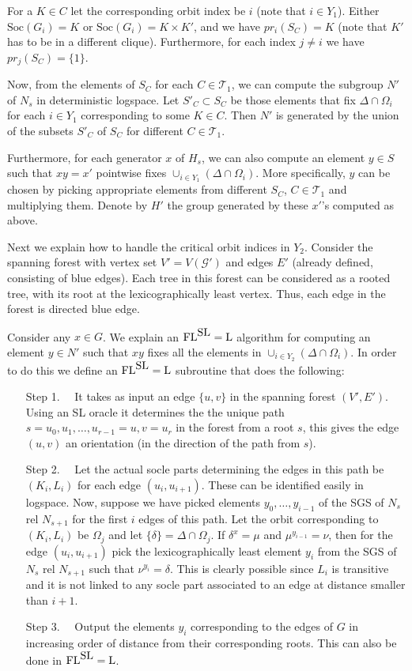 \documentclass[11pt]{article}
\newcommand{\Lo}{\ensuremath{\mathrm{L}}}
\newcommand{\SL}{\mbox{\rm SL}}
\newcommand{\FL}{\mbox{\rm FL}}
\newcommand{\Soc}[1]{\ensuremath{\mathrm{Soc}\left(#1\right)}}
\newcommand{\pr}[2]{\ensuremath{pr_{#1}\left({#2}\right)}}
\begin{document}
\noindent
For a $K\in C$ let the corresponding orbit index be $i$ (note that
$i\in Y_1$). Either $\Soc{G_i}=K$ or $\Soc{G_i}=K\times K'$, and we
have $\pr{i}{S_C}=K$ (note that $K'$ has to be in a different
clique). Furthermore, for each index $j\neq i$ we have
$\pr{j}{S_C}=\{1\}$.

Now, from the elements of $S_C$ for each $C\in\mathcal{T}_1$, we can
compute the subgroup $N'$ of $N_s$ in deterministic logspace. Let
$S'_C\subset S_C$ be those elements that fix $\Delta\cap\Omega_i$ for
each $i\in Y_1$ corresponding to some $K\in C$. Then $N'$ is generated
by the union of the subsets $S'_C$ of $S_C$ for different
$C\in\mathcal{T}_1$.

Furthermore, for each generator $x$ of $H_s$, we can also compute an
element $y\in S$ such that $xy=x'$ pointwise fixes $\cup_{i\in
Y_1}(\Delta\cap\Omega_i)$. More specifically, $y$ can be chosen by
picking appropriate elements from different $S_C$, $C\in\mathcal{T}_1$
and multiplying them. Denote by $H'$ the group generated by these
$x'$'s computed as above.

Next we explain how to handle the critical orbit indices in $Y_2$.
Consider the spanning forest with vertex set $V'=V(\mathcal{G}')$ and
edges $E'$ (already defined, consisting of blue edges). Each tree in
this forest can be considered as a rooted tree, with its root at the
lexicographically least vertex. Thus, each edge in the forest is
directed blue edge.

Consider any $x\in G$. We explain an $\FL^{\SL}=\Lo$ algorithm for
computing an element $y\in N'$ such that $xy$ fixes all the elements
in $\cup_{i\in Y_2}(\Delta\cap\Omega_i)$. In order to do this we define
an $\FL^{\SL}=\Lo$ subroutine that does the following:

\begin{enumerate}
\item[Step 1.]~~It takes as input an edge $\{u,v\}$ in the spanning
forest $(V',E')$. Using an SL oracle it determines the the unique path
$s=u_0,u_1,\ldots,u_{r-1}=u,v=u_r$ in the forest from a root $s$, this
gives the edge $(u,v)$ an orientation (in the direction of the path
from $s$).

\item[Step 2.]~~Let the actual socle parts determining the edges in
this path be $(K_i,L_i)$ for each edge $(u_i,u_{i+1})$. These can be
identified easily in logspace. Now, suppose we have picked elements
$y_0,\ldots,y_{i-1}$ of the SGS of $N_s$ rel $N_{s+1}$ for the first
$i$ edges of this path. Let the orbit corresponding to $(K_i,L_i)$ be
$\Omega_j$ and let $\{\delta\}=\Delta\cap \Omega_j$.  If
$\delta^x=\mu$ and $\mu^{y_{i-1}}=\nu$, then for the edge
$(u_i,u_{i+1})$ pick the lexicographically least element $y_i$ from
the SGS of $N_s$ rel $N_{s+1}$ such that $\nu^{y_i}=\delta$. This is
clearly possible since $L_i$ is transitive and it is not linked to any
socle part associated to an edge at distance smaller than $i+1$.

\item[Step 3.]~~Output the elements $y_i$ corresponding to the edges
of $G$ in increasing order of distance from their corresponding roots.
This can also be done in $\FL^{\SL}=\Lo$.
\end{enumerate}
\end{document}
